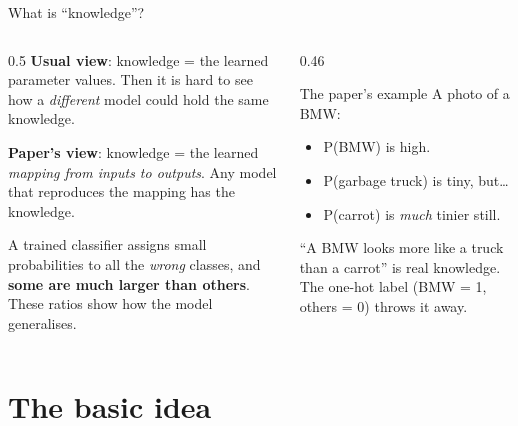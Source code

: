 \documentclass[aspectratio=169,11pt]{beamer}
\begin{document}
\begin{frame}{What is ``knowledge''?}
  \begin{columns}[T]
    \begin{column}{0.5\textwidth}
      \small
      \textbf{Usual view}: knowledge = the learned parameter values. Then it is hard to see how a \emph{different} model could hold the same knowledge.
      \vspace{2mm}

      \textbf{Paper's view}: knowledge = the learned \emph{mapping from inputs to outputs}.
      Any model that reproduces the mapping has the knowledge.
      \vspace{2mm}

      A trained classifier assigns small probabilities to all the \emph{wrong} classes, and \textbf{some are much larger than others}. These ratios show how the model generalises.
    \end{column}
    \begin{column}{0.46\textwidth}
      \begin{exampleblock}{The paper's example}
        \small
        A photo of a BMW:
        \begin{itemize}
          \item P(BMW) is high.
          \item P(garbage truck) is tiny, but\ldots
          \item P(carrot) is \emph{much} tinier still.
        \end{itemize}
        ``A BMW looks more like a truck than a carrot'' is real knowledge. The one-hot label (BMW = 1, others = 0) throws it away.
      \end{exampleblock}
    \end{column}
  \end{columns}
\end{frame}

\section{The basic idea}
\end{document}

